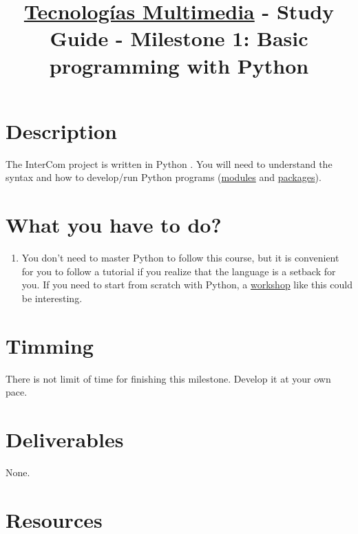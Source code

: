 \title{\href{https://www.ual.es/estudios/grados/presentacion/plandeestudios/asignatura/4015/40154321?idioma=zh_CN}{Tecnologías Multimedia} - Study Guide - Milestone 1: Basic programming with Python}

\maketitle

\section{Description}

The InterCom project \cite{intercom} is written in Python
\cite{Python}. You will need to understand the syntax and how to
develop/run Python programs
(\href{https://docs.python.org/3/tutorial/modules.html#modules}{modules}
and
\href{https://docs.python.org/3/tutorial/modules.html#packages}{packages}).

\section{What you have to do?}

\begin{enumerate}
\item You don't need to master Python to follow this course, but it is
  convenient for you to follow a tutorial \cite{python-tutorial} if
  you realize that the language is a setback for you. If you need to
  start from scratch with Python, a
  \href{https://github.com/vicente-gonzalez-ruiz/YAPT/tree/master/workshops/programacion_python_ESO}{workshop}
  \cite{YAPT} like this could be interesting.
\end{enumerate}

\section{Timming}

There is not limit of time for finishing this milestone. Develop it at
your own pace.

\section{Deliverables}

None.

\section{Resources}


